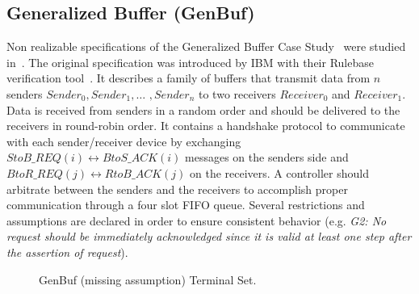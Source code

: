 %

\subsection{Generalized Buffer (GenBuf)}
Non realizable specifications of the Generalized Buffer Case Study~\cite{DBLP:journals/entcs/BloemGJPPW07} were studied in~\cite{DBLP:conf/fmcad/KonighoferHB09}.  
The original specification was introduced by 
IBM with their Rulebase verification tool~\cite{beer1996rulebase}.
It describes a family of buffers that transmit data from $n$ senders
$Sender_0,Sender_1$$,\ldots$ $,Sender_n$ to two receivers $Receiver_0$ and
$Receiver_1$.  Data is received from senders in a random order and should be
delivered to the receivers in round-robin order.  
It contains a handshake protocol to communicate with each sender/receiver device
by exchanging $StoB\_REQ(i) \leftrightarrow BtoS\_ACK(i)$ messages on the senders side
and $BtoR\_REQ(j) \leftrightarrow RtoB\_ACK(j)$ on the receivers.  
A controller should arbitrate between the senders and the receivers to
accomplish proper communication through a four slot FIFO queue.
Several restrictions and assumptions are declared in order
to ensure consistent behavior (e.g. \emph{G2: No request should be immediately
acknowledged since it is valid at least one step 
after the assertion of request}).\\

\begin{figure}[bt]
\centering
\SmallPicture
{}
\vspace*{-2mm}
\caption{GenBuf (missing assumption) Terminal Set.}
\label{fig:genbuf-terminal-set}
\vspace*{-4mm}
\MediumPicture
\end{figure}

